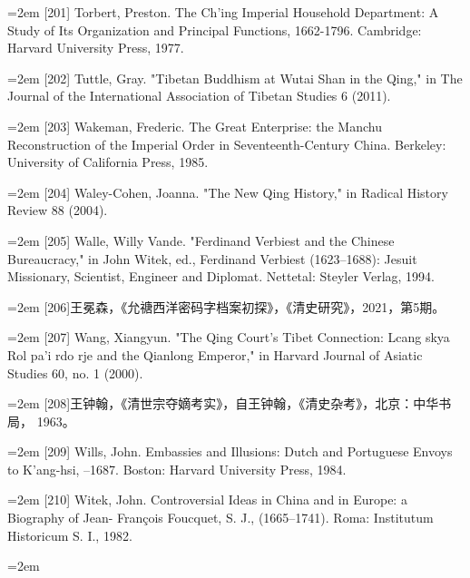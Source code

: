 \par
\noindent\hangindent=2em
[201] Torbert, Preston. The Ch’ing Imperial Household Department: A Study of Its%
\space%
Organization and Principal Functions, 1662-1796. Cambridge: Harvard%
\space%
University Press, 1977.%
\par
\noindent\hangindent=2em
[202] Tuttle, Gray. "Tibetan Buddhism at Wutai Shan in the Qing," in The Journal of%
\space%
the International Association of Tibetan Studies 6 (2011).%
\par
\noindent\hangindent=2em
[203] Wakeman, Frederic. The Great Enterprise: the Manchu Reconstruction of the%
\space%
Imperial Order in Seventeenth-Century China. Berkeley: University of California%
\space%
Press, 1985.%
\par
\noindent\hangindent=2em
[204] Waley-Cohen, Joanna. "The New Qing History," in Radical History Review 88%
(2004).%
\par
\noindent\hangindent=2em
[205] Walle, Willy Vande. "Ferdinand Verbiest and the Chinese Bureaucracy," in John%
\space%
Witek, ed., Ferdinand Verbiest (1623–1688): Jesuit Missionary, Scientist, Engineer%
\space%
and Diplomat. Nettetal: Steyler Verlag, 1994.%
\par
\noindent\hangindent=2em
[206]王冕森，《允禟西洋密码字档案初探》，《清史研究》，2021，第5期。%
\par
\noindent\hangindent=2em
[207] Wang, Xiangyun. "The Qing Court's Tibet Connection: Lcang skya Rol pa'i rdo%
\space%
rje and the Qianlong Emperor," in Harvard Journal of Asiatic Studies 60, no. 1%
(2000).%
\par
\noindent\hangindent=2em
[208]王钟翰，《清世宗夺嫡考实》，自王钟翰，《清史杂考》，北京：中华书局，%
1963。%
\par
\noindent\hangindent=2em
[209] Wills, John. Embassies and Illusions: Dutch and Portuguese Envoys to K'ang-hsi,%
–1687. Boston: Harvard University Press, 1984.%
\par
\noindent\hangindent=2em
[210] Witek, John. Controversial Ideas in China and in Europe: a Biography of Jean-%
François Foucquet, S. J., (1665–1741). Roma: Institutum Historicum S. I., 1982.%
\par
\noindent\hangindent=2em
